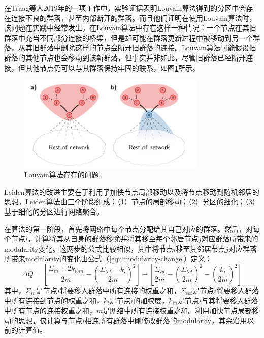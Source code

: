    在Traag等人2019年的一项工作\cite{traag2019louvain}中，实验证据表明Louvain算法得到的分区中会存在连接不良的群落，甚至内部断开的群落。而且他们证明在使用Louvain算法时，该问题在实践中经常发生。在Louvain算法中存在这样一种情况：一个节点在其旧群落中充当不同部分连接的桥梁，但是却可能在群落更新过程中被移动到另一个群落，从其旧群落中删除这样的节点会断开旧群落的连接。Louvain算法可能假设旧群落的其他节点也会移动到该新群落，但事实并非如此，尽管旧群落已经断开连接，但其他节点仍可以与其群落保持牢固的联系，如图\ref{fig:louvain-prob}所示。

\begin{figure}[!htb]
  \centering
  \includegraphics[width=0.8\textwidth]{figs/louvain-prob.png}
  \caption{Louvain算法存在的问题}
  \label{fig:louvain-prob}
\end{figure}

  Leiden算法的改进主要在于利用了加快节点局部移动\cite{ozaki2016simple,bae2017scalable}以及将节点移动到随机邻居\cite{traag2015faster}的思想。Leiden算法由三个阶段组成：（1）节点的局部移动；（2）分区的细化；（3）基于细化的分区进行网络聚合。

  在算法的第一阶段，首先将网络中每个节点分配给其自己对应的群落。然后，对每个节点$i$，计算将其从自身的群落移除并将其移至每个邻居节点$j$对应群落所带来的modularity变化。这两步的公式比较相似，其中将节点$i$移至其邻居节点$j$对应群落所带来modularity的变化由公式（\ref{equ:modularity-change}）定义：
\begin{equation}
  \label{equ:modularity-change}
  \Delta{Q} = \left[\frac{{\Sigma}_{in} + 2k_{i,in}}{2m} - \left(\frac{{\Sigma}_{tot} + k_{i}}{2m}\right)^{2}\right] - \left[\frac{{\Sigma}_{in}}{2m} - \left(\frac{{\Sigma}_{tot}}{2m}\right)^{2} - \left(\frac{k_{i}}{2m}\right)^{2}\right]
\end{equation}
其中，${\Sigma}_{in}$是节点$i$将要移入群落中所有连接的权重之和，${\Sigma}_{tot}$是节点$i$将要移入群落中所有连接到节点的权重之和，$k_{i}$是节点$i$的加权度，$k_{in}$是节点$i$与其将要移入群落中所有节点的连接权重之和，$m$是网络中所有连接权重之和。利用加快节点局部移动\cite{ozaki2016simple,bae2017scalable}的思想，仅计算与节点$i$相连所有群落中刚修改群落的modularity，其余沿用以前的计算值。

